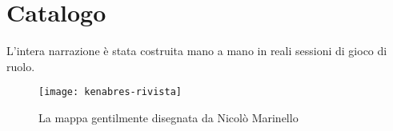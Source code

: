 {}
\chapter*{Catalogo}
\begingroup 
    \let\clearpage\relax
    \let\cleardoublepage\relax
    \let\cleardoublepage\relax
\pagestyle{scrheadings} 

L'intera narrazione \`e stata costruita mano a mano in reali sessioni di gioco di ruolo.

\begin{figure}[ht]
    \texttt{[image: kenabres-rivista]}
    \caption{La mappa gentilmente disegnata da Nicol\`o Marinello}
\end{figure}

\endgroup 